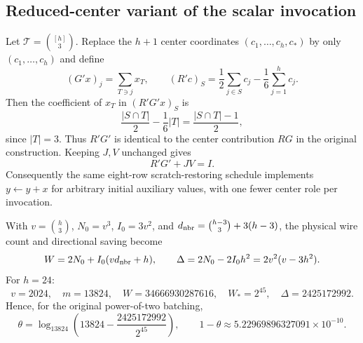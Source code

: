 \subsection*{Reduced-center variant of the scalar invocation}

Let $\mathcal T=\binom{[h]}3$.  Replace the $h+1$ center coordinates
$(c_1,\ldots,c_h,c_*)$ by only $(c_1,\ldots,c_h)$ and define
\[
 (G'x)_j=\sum_{T\ni j}x_T,
 \qquad
 (R'c)_S=\frac12\sum_{j\in S}c_j-\frac16\sum_{j=1}^h c_j.
\]
Then the coefficient of $x_T$ in $(R'G'x)_S$ is
\[
 \frac{|S\cap T|}{2}-\frac16|T|
 =\frac{|S\cap T|-1}{2},
\]
since $|T|=3$.  Thus $R'G'$ is identical to the center contribution
$RG$ in the original construction.  Keeping $J,V$ unchanged gives
\[
 R'G'+JV=I.
\]
Consequently the same eight-row scratch-restoring schedule implements
$y\gets y+x$ for arbitrary initial auxiliary values, with one fewer
center role per invocation.

With $v=\binom h3$, $N_0=v^3$, $I_0=3v^2$, and
$d_{\rm nbr}=\binom{h-3}{3}+3(h-3)$, the physical wire count and
directional saving become
\[
 W=2N_0+I_0(vd_{\rm nbr}+h),
 \qquad
 \Delta=2N_0-2I_0h^2
       =2v^2(v-3h^2).
\]
For $h=24$:
\[
 v=2024,\quad m=13824,\quad W=34666930287616,\quad
 W_*=2^{45},\quad \Delta=2425172992.
\]
Hence, for the original power-of-two batching,
\[
 \theta=\log_{13824}\!\left(13824-\frac{2425172992}{2^{45}}\right),
 \qquad
 1-\theta\approx 5.22969896327091\times10^{-10}.
\]
